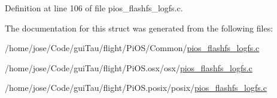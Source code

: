 Definition at line 106 of file pios\-\_\-flashfs\-\_\-logfs.\-c.



The documentation for this struct was generated from the following files\-:\begin{DoxyCompactItemize}
\item 
/home/jose/\-Code/gui\-Tau/flight/\-Pi\-O\-S/\-Common/\hyperlink{_common_2pios__flashfs__logfs_8c}{pios\-\_\-flashfs\-\_\-logfs.\-c}\item 
/home/jose/\-Code/gui\-Tau/flight/\-Pi\-O\-S.\-osx/osx/\hyperlink{osx_2osx_2pios__flashfs__logfs_8c}{pios\-\_\-flashfs\-\_\-logfs.\-c}\item 
/home/jose/\-Code/gui\-Tau/flight/\-Pi\-O\-S.\-posix/posix/\hyperlink{posix_2posix_2pios__flashfs__logfs_8c}{pios\-\_\-flashfs\-\_\-logfs.\-c}\end{DoxyCompactItemize}

